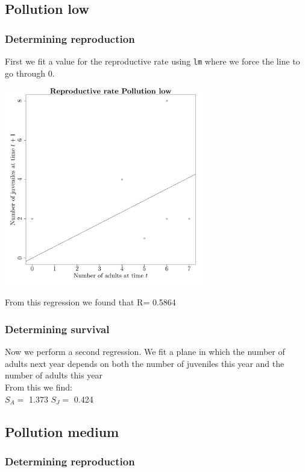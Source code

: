 \documentclass{article}\usepackage[]{graphicx}\usepackage[]{color}
\begin{document}
\subsection{ Pollution low }
\subsubsection{Determining reproduction}

First we fit a value for the reproductive rate using \texttt{lm} where we force the line to go through $0$. 



{\centering \includegraphics[width=0.65\textwidth]{figure/k55} 

}



 From this regression we found that R= 0.5864 

\subsubsection{Determining survival}

Now we perform a second regression. We fit a plane in which the number of adults next year depends on both the number of juveniles this year and the number of adults this year\\From this we find:\\ 
$S_A=$ 1.373 
$S_J=$ 0.424 
\subsection{ Pollution medium }
\subsubsection{Determining reproduction}
\end{document}
